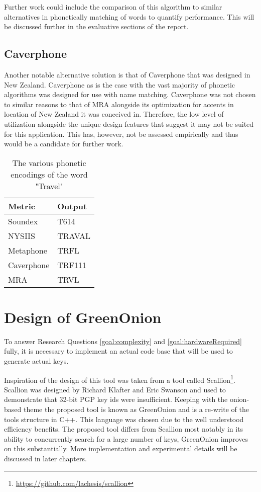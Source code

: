 Further work could include the comparison of this algorithm  to similar alternatives in phonetically matching of words to quantify performance. This will be discussed further in the evaluative sections of the report.

\subsection{Caverphone}
Another notable alternative solution is that of Caverphone that was designed in New Zealand. Caverphone as is the case with the vast majority of phonetic algorithms was designed for use with name matching. Caverphone was not chosen to similar reasons to that of MRA alongside its optimization for accents in location of New Zealand it was conceived in. Therefore, the low level of utilization alongside the unique design features that suggest it may not be suited for this application. This has, however, not be assessed empirically and thus would be a candidate for further work.

\begin{table}[h!]
    \centering
    \begin{tabular}{ll}
        Metric & Output \\
        \hline    
        Soundex & T614 \\
        NYSIIS & TRAVAL\\
        Metaphone & TRFL\\
        Caverphone & TRF111\\
        MRA & TRVL
    \end{tabular}
    \caption{The various phonetic encodings of the word "Travel"}
\end{table}

\section{Design of GreenOnion}
\label{sec:greenDesign}
To answer Research Questions \ref{goal:complexity} and \ref{goal:hardwareRequired} fully, it is necessary to implement an actual code base that will be used to generate actual keys. 

Inspiration of the design of this tool was taken from a tool called Scallion\footnote{\url{https://github.com/lachesis/scallion}}. Scallion was designed by Richard Klafter and Eric Swanson and used to demonstrate that 32-bit PGP key ids were insufficient. Keeping with the onion-based theme the proposed tool is known as GreenOnion and is a re-write of the tools structure in C++. This language was chosen due to the well understood efficiency benefits. The proposed tool differs from Scallion most notably in its ability to concurrently search for a large number of keys, GreenOnion improves on this substantially. More implementation and experimental details will be discussed in later chapters.

